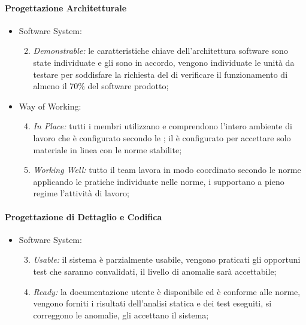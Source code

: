 	\paragraph{Progettazione Architetturale}	
		\begin{itemize}
    		\item Software System:
    			\begin{enumerate}
    			\setcounter{enumi}{1}
    				\item \emph{Demonstrable:} le caratteristiche chiave dell'architettura software sono state individuate e gli  sono in accordo, vengono individuate le unità da testare per soddisfare la richiesta del  di verificare il funzionamento di almeno il 70\% del software prodotto;
    			\end{enumerate}
    		\item Way of Working:
    			\begin{enumerate}
    			\setcounter{enumi}{3}
    				\item \emph{In Place:} tutti i membri utilizzano e comprendono l'intero ambiente di lavoro che è configurato secondo le \NormeDiProgetto ; il  è configurato per accettare solo materiale in linea con le norme stabilite;
    				\item \emph{Working Well:} tutto il team lavora in modo coordinato secondo le norme applicando le pratiche individuate nelle 	norme, i  supportano a pieno regime l'attività di lavoro;
    			\end{enumerate}
    			
    	\end{itemize}
    	
	\paragraph{Progettazione di Dettaglio e Codifica}	
		\begin{itemize}
    		\item Software System:
    			\begin{enumerate}
    			\setcounter{enumi}{2}
    				\item \emph{Usable:} il sistema è parzialmente usabile, vengono praticati gli opportuni test che saranno convalidati, il livello di anomalie sarà accettabile;
    				\item\emph{Ready: }la documentazione utente è disponibile ed è conforme alle norme, vengono forniti i risultati dell'analisi statica e dei test eseguiti, si correggono le anomalie, gli  accettano il sistema;
    			\end{enumerate}
    	\end{itemize}
    	

